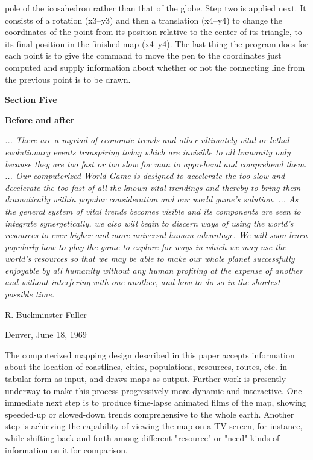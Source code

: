 pole of the icosahedron rather than that of the globe.
\bigskip\flushpar
Step two is applied next.  It consists of a
rotation (x3--y3) and then a translation (x4--y4) to
change the coordinates of the point from its position
relative to the center of its triangle, to its final
position in the finished map (x4--y4).
\bigskip\flushpar
The last thing the program does for each point is
to give the command to move the pen to the coordinates
just computed and supply information about whether or
not the connecting line from the previous point is to
be drawn.
\vfill\eject
\centerline{\bf Section Five}
\bigskip\centerline{\bf Before and after}
\bigskip\bigskip\narrower
{\it\flushpar
... There are a myriad of economic
trends and other ultimately vital or
lethal evolutionary events transpiring
today which are invisible to
all humanity only because they are
too fast or too slow for man to apprehend
and comprehend them.
\bigskip\flushpar
... Our computerized World Game is
designed to accelerate the too slow
and decelerate the too fast of all
the known vital trendings and thereby
to bring them dramatically within
popular consideration and our world
game's solution.
\bigskip\flushpar
... As the general system of vital
trends becomes visible and its components
are seen to integrate synergetically,
we also will begin to discern
ways of using the world's resources
to ever higher and more universal
human advantage.  We will soon
learn popularly how to play the game
to explore for ways in which we may
use the world's resources so that we
may be able to make our whole planet
successfully enjoyable by all humanity
without any human profiting at the
expense of another and without interfering
with one another, and how to
do so in the shortest possible time.
\bigskip\par
R. Buckminster Fuller
\bigskip\par
Denver, June 18, 1969}
\bigskip\bigskip\flushpar
The computerized mapping design described in
this paper accepts information about the location of
coastlines, cities, populations, resources, routes,
etc. in tabular form as input, and draws maps as output.
\bigskip\flushpar
Further work is presently underway to make this
process progressively more dynamic and interactive.
One immediate next step is to produce time-lapse
animated films of the map, showing speeded-up or
slowed-down trends comprehensive to the whole earth.
Another step is achieving the capability of viewing
the map on a TV screen, for instance, while shifting
back and forth among different "resource" or "need"
kinds of information on it for comparison.
